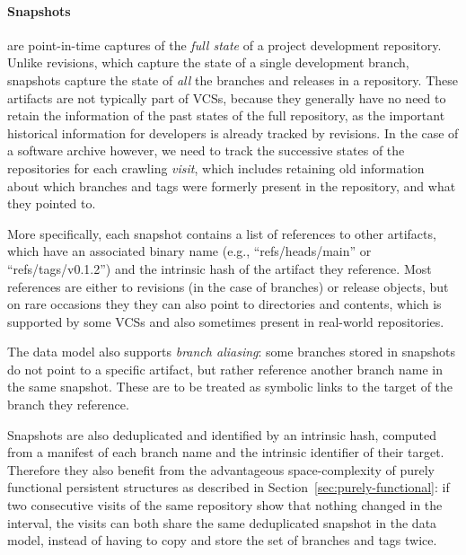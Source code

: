 \begin{figure}\centering
{}
\end{figure}
\paragraph{\textbf{Snapshots}} are point-in-time captures of the \emph{full
state} of a project development repository. Unlike revisions, which capture the
state of a single development branch, snapshots capture the state of \emph{all}
the branches and releases in a repository. These artifacts are not typically
part of \glspl{VCS}, because they generally have no need to retain the
information of the past states of the full repository, as the important
historical information for developers is already tracked by revisions. In the
case of a software archive however, we need to track the successive states of
the repositories for each crawling \emph{visit}, which includes retaining old
information about which branches and tags were formerly present in the
repository, and what they pointed to.

More specifically, each snapshot contains a list of references to other
artifacts, which have an associated binary name (e.g., ``refs/heads/main'' or
``refs/tags/v0.1.2'') and the intrinsic hash of the artifact they reference.
Most references are either to revisions (in the case of branches) or release
objects, but on rare occasions they they can also point to directories and
contents, which is supported by some \glspl{VCS} and also sometimes present in
real-world repositories.

The data model also supports \emph{branch aliasing}: some branches stored in
snapshots do not point to a specific artifact, but rather reference another
branch name in the same snapshot. These are to be treated as symbolic links to
the target of the branch they reference.

Snapshots are also deduplicated and identified by an intrinsic hash, computed
from a manifest of each branch name and the intrinsic identifier of their
target. Therefore they also benefit from the advantageous space-complexity of
purely functional persistent structures as described in
Section~\ref{sec:purely-functional}: if two consecutive visits of the same
repository show that nothing changed in the interval, the visits can both share
the same deduplicated snapshot in the data model, instead of having to copy and
store the set of branches and tags twice.


